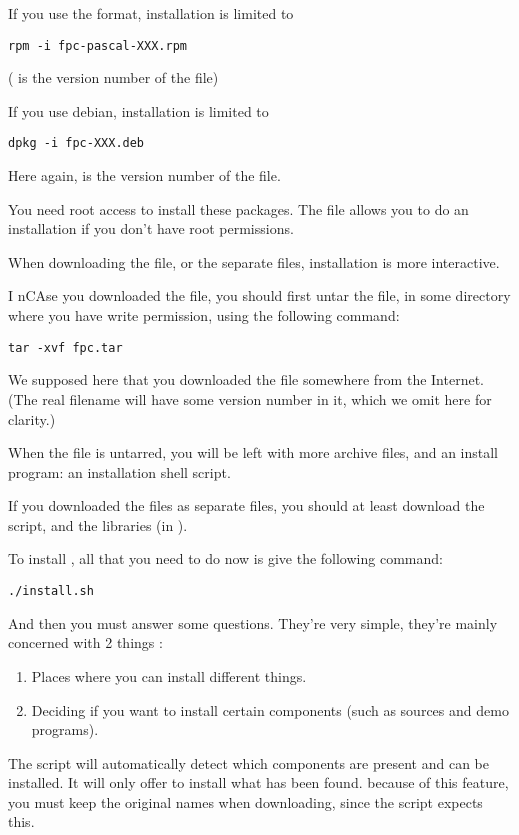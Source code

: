 \documentclass{report}
\begin{document}
If you use the  format, installation is limited to
\begin{verbatim}
rpm -i fpc-pascal-XXX.rpm
\end{verbatim}
( is the version number of the  file)

If you use debian, installation is limited to 
\begin{verbatim}
dpkg -i fpc-XXX.deb
\end{verbatim}
Here again,  is the version number of the  file.

You need root access to install these packages. The  file
allows you to do an installation if you don't have root permissions.

When downloading the  file, or the separate files,
 installation is more interactive.

I nCAse you downloaded the  file, you should first untar 
the file, in some directory where 
you have write permission, using the following command:
\begin{verbatim}
tar -xvf fpc.tar
\end{verbatim}
We supposed here that you downloaded the file  somewhere
from the Internet. (The real filename will have some version number in it, 
which we omit here for clarity.)

When the file is untarred, you will be left with more archive files, and
an install program: an installation shell script. 

If you downloaded the files as separate files, you should at least download
the  script, and the libraries (in ). 

To install \fpc, all that you need to do now is give the following command:
\begin{verbatim}
./install.sh
\end{verbatim}
And then you must answer some questions. They're very simple, they're
mainly concerned with 2 things :
\begin{enumerate}
\item Places where you can install different things.
\item Deciding if you want to install certain components (such as sources
and demo programs). 
\end{enumerate}
The script will automatically detect which components are present and can be
installed. It will only offer to install what has been found.
because of this feature, you must keep the original names when downloading,
since the script expects this.
 
\end{document}
